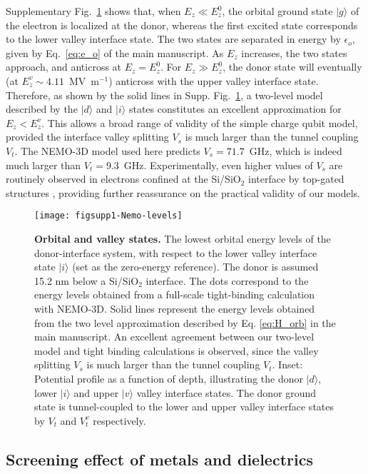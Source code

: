 \documentclass[aps,prb,superscriptaddress,nobibnotes,twocolumn]{revtex4-1}
\begin{document}
Supplementary Fig.~\ref{fig:Nemo-levels} shows that, when $E_z \ll E_z^0$, the orbital ground state $\lvert g \rangle $ of the electron is localized at the donor, whereas the first excited state corresponds to the lower valley interface state. The two states are separated in energy by $\epsilon_o$, given by Eq.~\ref{eq:e_o} of the main manuscript. As $E_z$ increases, the two states approach, and anticross at $E_z = E_z^0$. For $E_z \gg E_z^0$, the donor state will eventually (at $E_z^v \sim 4.11$~MV~m$^{-1}$) anticross with the upper valley interface state. Therefore, as shown by the solid lines in Supp. Fig.~\ref{fig:Nemo-levels}, a two-level model described by the $\lvert d \rangle$ and $\lvert i \rangle$ states constitutes an excellent approximation for $E_z < E_z^v$. This allows a broad range of validity of the simple charge qubit model, provided the interface valley splitting $V_s$ is much larger than the tunnel coupling $V_t$. The NEMO-3D model used here predicts $V_s = 71.7$~GHz, which is indeed much larger than $V_t = 9.3$~GHz. Experimentally, even higher values of $V_s$ are routinely observed in electrons confined at the Si/SiO$_2$ interface by top-gated structures \cite{Yang2013S}, providing further reassurance on the practical validity of our models.

\begin{figure}
\centering
\texttt{[image: figsupp1-Nemo-levels]}
\caption{\textbf{Orbital and valley states.} The lowest orbital energy levels of the donor-interface system, with respect to the lower valley interface state $\lvert i \rangle$ (set as the zero-energy reference). The donor is assumed 15.2 nm below a Si/SiO$_2$ interface. The dots correspond to the energy levels obtained from a full-scale tight-binding calculation with NEMO-3D. Solid lines represent the energy levels obtained from the two level approximation described by Eq. \ref{eq:H_orb} in the main manuscript. An excellent agreement between our two-level model and tight binding calculations is observed, since the valley splitting $V_s$ is much larger than the tunnel coupling $V_t$. Inset: Potential profile as a function of depth, illustrating the donor $\lvert d \rangle$, lower $\lvert i \rangle$ and upper $\lvert v \rangle$ valley interface states. The donor ground state is tunnel-coupled to the lower and upper valley interface states by $V_t$ and $V_t^v$  respectively.}
\label{fig:Nemo-levels}
\end{figure}


\subsection{\label{App:Screening-image-charges}Screening effect of metals and dielectrics}
\end{document}
